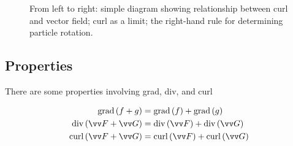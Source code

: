 \begin{figure}[h]
    \centering
    \qquad
    \qquad
    \caption{From left to right: simple diagram showing relationship between curl and vector field; curl as a limit; the right-hand rule for determining particle rotation.}
    \label{fig:curl}
\end{figure}

\subsection{Properties}
There are some properties involving grad, div, and curl

\begin{theorem}
$$
\begin{aligned}
\Grad(f+g) &= \Grad(f) + \Grad(g) \\
\Div(\vv F + \vv G) &= \Div(\vv F) + \Div(\vv G) \\
\Curl(\vv F + \vv G) &= \Curl(\vv F) + \Curl(\vv G) \\
\end{aligned}
$$
\end{theorem}

